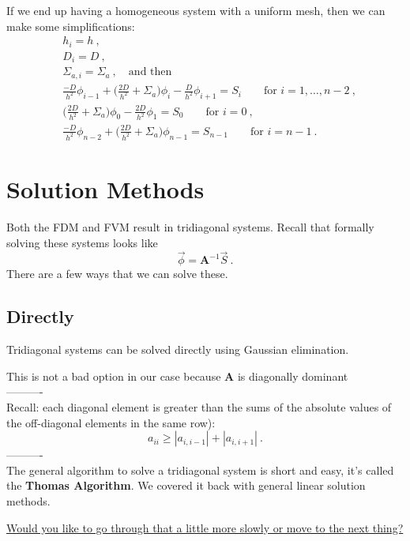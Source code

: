 \documentclass[12pt]{article}
\newcommand{\ve}[1]{\ensuremath{\mathbf{#1}}}
\begin{document}
If we end up having a homogeneous system with a uniform mesh, then we can make some simplifications:
%
\begin{align}
&h_i = h\:, \nonumber \\
&D_i = D\:, \nonumber \\
&\Sigma_{a,i} = \Sigma_a\:, \quad \text{and then} \nonumber \\
%
&\frac{-D}{h^2}\phi_{i-1} + \biggl(\frac{2D}{h^2} + \Sigma_a \biggr)\phi_i - \frac{D}{h^2}\phi_{i+1} = S_i \qquad \text{for } i = 1, \dots, n-2\:, \nonumber \\
%
&\biggl(\frac{2D}{h^2} + \Sigma_a \biggr) \phi_0 - \frac{2D}{h^2}\phi_{1} = S_0 \qquad \text{for } i = 0 \:,\nonumber \\
%
&\frac{-D}{h^2}\phi_{n-2} + \biggl(\frac{2D}{h^2} + \Sigma_a \biggr)\phi_{n-1} = S_{n-1} \qquad \text{for } i = n-1\:. \nonumber
\end{align}


\section*{Solution Methods}

Both the FDM and FVM result in tridiagonal systems. Recall that formally solving these systems looks like
\[\vec{\phi} = \ve{A}^{-1}\vec{S} \:.\]
There are a few ways that we can solve these. 

\subsection*{Directly}

Tridiagonal systems can be solved directly using Gaussian elimination. 

This is not a bad option in our case because $\ve{A}$ is diagonally dominant\\
----------\\
Recall:  
each diagonal element is greater than the sums of the absolute values of the off-diagonal elements in the same row):
\[a_{ii} \geq |a_{i,i-1}| + |a_{i, i+1}|\:.\] 
----------\\
%
The general algorithm to solve a tridiagonal system is short and easy, it's called the \textbf{Thomas Algorithm}. We covered it back with general linear solution methods. 

\underline{Would you like to go through that a little more slowly or move to the next thing?}
\end{document}
